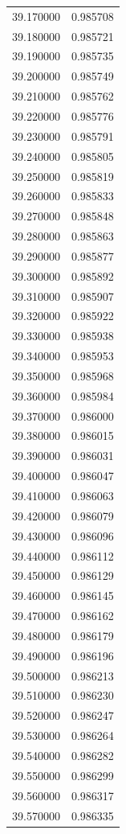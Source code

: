 \begin{tabular}{rr}
39.170000 & 0.985708 \\
39.180000 & 0.985721 \\
39.190000 & 0.985735 \\
39.200000 & 0.985749 \\
39.210000 & 0.985762 \\
39.220000 & 0.985776 \\
39.230000 & 0.985791 \\
39.240000 & 0.985805 \\
39.250000 & 0.985819 \\
39.260000 & 0.985833 \\
39.270000 & 0.985848 \\
39.280000 & 0.985863 \\
39.290000 & 0.985877 \\
39.300000 & 0.985892 \\
39.310000 & 0.985907 \\
39.320000 & 0.985922 \\
39.330000 & 0.985938 \\
39.340000 & 0.985953 \\
39.350000 & 0.985968 \\
39.360000 & 0.985984 \\
39.370000 & 0.986000 \\
39.380000 & 0.986015 \\
39.390000 & 0.986031 \\
39.400000 & 0.986047 \\
39.410000 & 0.986063 \\
39.420000 & 0.986079 \\
39.430000 & 0.986096 \\
39.440000 & 0.986112 \\
39.450000 & 0.986129 \\
39.460000 & 0.986145 \\
39.470000 & 0.986162 \\
39.480000 & 0.986179 \\
39.490000 & 0.986196 \\
39.500000 & 0.986213 \\
39.510000 & 0.986230 \\
39.520000 & 0.986247 \\
39.530000 & 0.986264 \\
39.540000 & 0.986282 \\
39.550000 & 0.986299 \\
39.560000 & 0.986317 \\
39.570000 & 0.986335 \\

\end{tabular}
